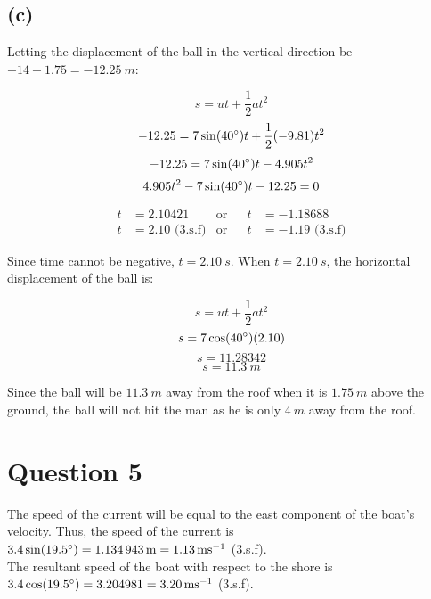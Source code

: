 \documentclass[11pt]{article}
\begin{document}
\begin{center}
\end{center}

\newpage

\subsection{(c)}
\label{sec:org6f4a5c5}

Letting the displacement of the ball in the vertical direction be \(- 14 + 1.75 = \qty{-12.25}{m}\):

\[s = ut + \frac{1}{2}at^2\]
\[-12.25 = 7\sin(40 \degree)t + \frac{1}{2}(-9.81)t^2\]
\[-12.25 = 7\sin(40 \degree)t - 4.905t^2\]
\[4.905t^2 - 7\sin(40 \degree)t - 12.25 = 0\]

\begin{align*}
t &= 2.10421 &\text{or}& &t &= -1.18688 \\
t &= 2.10 \text{ (3.s.f)} &\text{or}& &t &= -1.19 \text{ (3.s.f)}
\end{align*}

Since time cannot be negative, \(t = \qty{2.10}{s}\). When \(t = \qty{2.10}{s}\), the horizontal displacement of the ball is:

\[s = ut + \frac{1}{2}at^2\]
\[s = 7\cos(40 \degree)(2.10)\]
\[s = 11.28342\]
\[s = \qty{11.3}{m}\]

Since the ball will be \(\qty{11.3}{m}\) away from the roof when it is \(\qty{1.75}{m}\) above the ground, the ball will not hit the man as he is only \(\qty{4}{m}\) away from the roof.


\section{Question 5}
\label{sec:orgf768e96}

The speed of the current will be equal to the east component of the boat's velocity. Thus, the speed of the current is \(3.4\sin(19.5 \degree) = \qty{1.134943}{m} = \qty{1.13}{ms^{-1}}\) (3.s.f).
\\[0pt]

The resultant speed of the boat with respect to the shore is \(3.4\cos(19.5 \degree) = 3.204981 = \qty{3.20}{ms^{-1}}\) (3.s.f).
\end{document}
